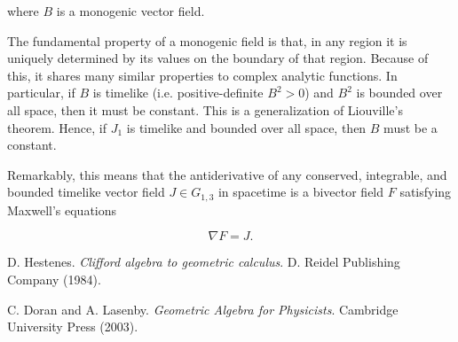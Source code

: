\documentclass{article}
\begin{document}
  where $B$ is a monogenic vector field. 

  The fundamental property of a monogenic field is that, in any region it is uniquely determined by its values on the boundary of that region. Because of this, it shares many similar properties to complex analytic functions. In particular, if $B$ is timelike (i.e. positive-definite $B^2 > 0$) and $B^2$ is bounded over all space, then it must be constant.\cite{gap} This is a generalization of Liouville's theorem. Hence, if $J_1$ is timelike and bounded over all space, then $B$ must be a constant.

  Remarkably, this means that the antiderivative of any conserved, integrable, and bounded timelike vector field $J \in G_{1,3}$ in spacetime is a bivector field $F$ satisfying Maxwell's equations

  \begin{equation}
    \nabla F = J.\label{eq:maxwell}
  \end{equation}

  \begin{thebibliography}{9} 

      D. Hestenes.
      \emph{Clifford algebra to geometric calculus}.
      D. Reidel Publishing Company (1984).

      C. Doran and A. Lasenby.
      \emph{Geometric Algebra for Physicists}. Cambridge University Press (2003).

  \end{thebibliography}
\end{document}
